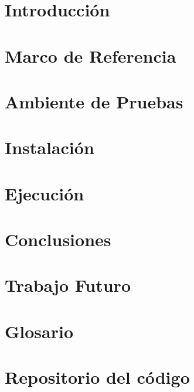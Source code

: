 \documentclass[twoside,letterpaper,12pt]{report}
\begin{document}
\newpage
{}

\chapter{Introducción}


\chapter{Marco de Referencia}\label{ChapRef}


\chapter{Ambiente de Pruebas}


\chapter{Instalación}


\chapter{Ejecución}


\chapter{Conclusiones}


\chapter{Trabajo Futuro}


\chapter{Glosario} \label{chapGlosario}



\newpage



	


\newpage

\appendix
\chapter{Repositorio del código}

\end{document}
